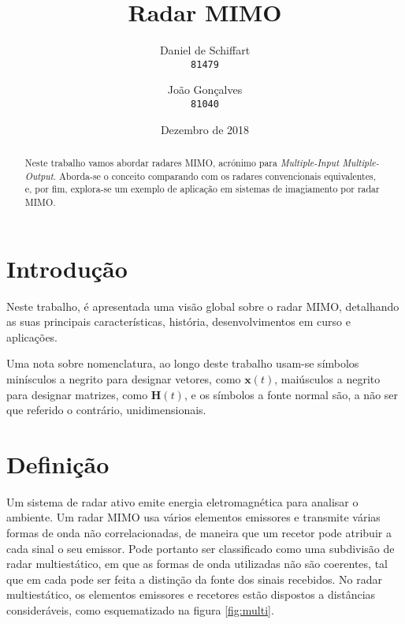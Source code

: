 \documentclass[purist,portuguese]{ist-report}
\author{Daniel de Schiffart \\ \texttt{81479} \and João Gonçalves \\ \texttt{81040}}
\title{Radar MIMO}
\subtitle{}
\date{Dezembro de 2018}
\begin{document}
\makecover


{ \tableofcontents}

\newpage

\begin{abstract}
  Neste trabalho vamos abordar radares MIMO, acrónimo para \textit{Multiple-Input Multiple-Output}. Aborda-se o conceito comparando com os radares convencionais equivalentes, e, por fim, explora-se um exemplo de aplicação em sistemas de imagiamento por radar MIMO.
\end{abstract}

\section{Introdução}


Neste trabalho, é apresentada uma visão global sobre o radar MIMO, detalhando as suas principais características, história, desenvolvimentos em curso e aplicações.

Uma nota sobre nomenclatura, ao longo deste trabalho usam-se símbolos minísculos a negrito para designar vetores, como $\mathbf{x}(t)$, maiúsculos a negrito para designar matrizes, como $\mathbf{H}(t)$, e os símbolos a fonte normal são, a não ser que referido o contrário, unidimensionais.

\section{Definição}

Um sistema de radar ativo emite energia eletromagnética para analisar o ambiente.
Um radar MIMO usa vários elementos emissores e transmite várias formas de onda não correlacionadas, de maneira que um recetor pode atribuir a cada sinal o seu emissor. 
Pode portanto ser classificado como uma subdivisão de radar multiestático, em que as formas de onda utilizadas não são coerentes, tal que em cada pode ser feita a distinção da fonte dos sinais recebidos.
No radar multiestático, os elementos emissores e recetores estão dispostos a distâncias consideráveis, como esquematizado na figura \ref{fig:multi}.
\end{document}
